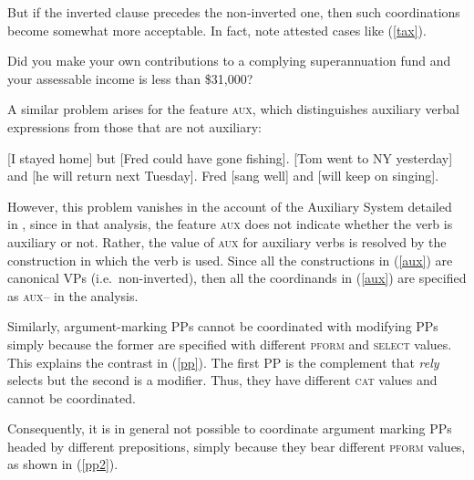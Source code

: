 \eal
{}
\zl

\noindent
But if the inverted clause precedes the non-inverted one, then such coordinations become somewhat
more acceptable. In fact, \citet[1332--1333]{rodney} note attested cases like (\ref{tax}).

\ea
Did you make your own contributions to a complying superannuation fund and
your assessable income is less than \$31,000?\label{tax}\label{ex-did-you-make-and-your-asessable-income-is}
\z

\largerpage
\noindent
A similar problem arises for the feature \textsc{aux}, which distinguishes auxiliary verbal expressions from those that
are not auxiliary:

\ealnoraggedright
\label{aux}
\ex {}[I stayed home]\sub{\aux $-$} but [Fred could have gone fishing]\sub{\aux $+$}.
\ex {}[Tom went to NY yesterday]\sub{\aux $-$} and [he will return next Tuesday]\sub{\aux $+$}.
\ex Fred [sang well]\sub{\aux $-$} and [will keep on singing]\sub{\aux $+$}.
\zl

\noindent
However, this problem vanishes in the account of the  Auxiliary System detailed in
\citet{SagEtAl20}, since in that analysis, the feature \textsc{aux} does not indicate\pagebreak{} whether the
verb is auxiliary or not. Rather, the value of \textsc{aux} for auxiliary verbs is resolved by the
construction in which the verb is used. Since all the constructions in (\ref{aux}) are canonical VPs
(i.e.\ non-inverted), then all the coordinands in (\ref{aux}) are specified as \textsc{aux--} in the
\citet{SagEtAl20} analysis.

Similarly, argument-marking PPs cannot be coordinated with modifying PPs simply because the former
are specified with different \textsc{pform} and \textsc{select} values. This explains the contrast
in (\ref{pp}). The first PP is the complement that \emph{rely} selects but the second is a
modifier. Thus, they have different \textsc{cat} values and cannot be coordinated.


\eal
\label{pp}
\zl

\noindent
Consequently, it is in general not possible to coordinate argument marking PPs headed by different prepositions, simply because they bear
different \textsc{pform} values, as shown in (\ref{pp2}).


